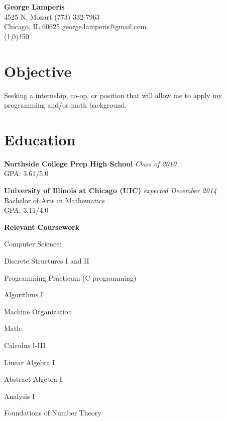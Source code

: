 \documentclass[letterpaper, 12pt, oneside]{memoir}
\begin{document}
\begin{center}
    \textbf{\LARGE{George Lamperis}} \\
    4525 N. Mozart      \hfill  (773) 332-7963  \\
    Chicago, IL 60625   \hfill  george.lamperis@gmail.com \\
    \line(1,0){450}
\end{center}

\section*{Objective}
Seeking a internship, co-op, or position that will allow me to apply my
programming and/or math background.

\section*{Education}
\textbf{Northside College Prep High School} \hfill \emph{Class of 2010} \\
GPA: 3.61/5.0

\textbf{University of Illinois at Chicago (UIC)} \hfill \emph{expected December 2014} \\
Bachelor of Arts in Mathematics \\
GPA: 3.11/4.0

\textbf{Relevant Coursework}

Computer Science:
\begin{compactitem}
    \item Discrete Structures I and II
    \item Programming Practicum (C programming)
    \item Algorithms I
    \item Machine Organization
\end{compactitem}

Math:
\begin{compactitem}
    \item Calculus I-III 
    \item Linear Algebra I
    \item Abstract Algebra I
    \item Analysis I
    \item Foundations of Number Theory
\end{compactitem}
\end{document}
